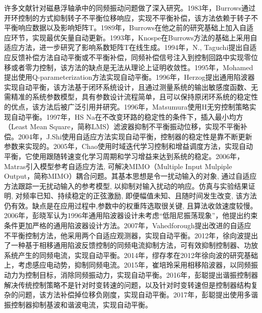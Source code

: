 \documentclass[
  lang=cn,
  degree=master,
  openany,oneside
]{nuaathesis}
\begin{document}
许多文献针对磁悬浮轴承中的同频振动问题做了深入研究。1983年，Burrows通过开环控制的方式抑制转子不平衡位移响应，实现不平衡补偿，该方法依赖于转子不平衡响应数据以及影响矩阵T\cite{burrows1983vibration}。1989年，Burrows在他之前的研究基础上加入自适应环节，实现最优矢量自动更新\cite{burrows1989active}。1993年，Knospe在Burrows方法的基础上采用自适应方法，进一步研究了影响系数矩阵T在线生成\cite{knospe1993adaptive}。1994年，N., Taguchi提出自适应反馈补偿方法自动平衡或不平衡补偿，同频补偿信号注入到控制回路中实现零位移或者零力控制，该方法的缺点是无法从理论上证明收敛性\cite{taguchi1994unbalance}。1995年，Mohamed提出使用Q-parameterization方法实现自动平衡\cite{mohamed1995imbalance}。1996年，Herzog提出通用陷波器实现自动平衡，该方法基于闭环系统设计，且通过测量系统的输出敏感度函数、无需精准的系统参数模型，具有参数设计流程简单，且可以保持原闭环系统的稳定性的优点，该方法后被广泛引用并研究\cite{herzog1996unbalance}。1996年，Matsumura使用H无穷控制策略实现自动平衡\cite{matsumura1996application}。1997年，HS Na在不改变环路的稳定性的条件下，插入最小均方（Least Mean Square，简称LMS）滤波器抑制不平衡振动位移，实现不平衡补偿\cite{na1997adaptive}。2004年，J.Shi使用自适应方法实现自动平衡，控制器的稳定性是靠不断更新参数来实现的\cite{shi2004synchronous}。2005年，Chao使用时域迭代学习控制和增益调度方法，实现自动平衡，它使用跟随转速变化学习周期和学习增益来达到系统的稳定\cite{bi2005automatic}。2006年，Matras引入模型参考自适应方法, 可解决MIMO（Multiple Input Mulpiple Output，简称MIMO）耦合问题。其基本思想是令一扰动输入的对象, 通过自适应方法跟踪一无扰动输入的参考模型, 以抑制对输入扰动的响应。仿真与实验结果证明, 对频率已知、持续稳定的正弦激励, 即便幅值未知、且随时间发生改变, 该方法仍有效。缺点是在应用过程中,参数中的权重阵选取很关键, 且算法收敛速度较慢\cite{matras2006suppression}。2006年，彭晓军认为1996年通用陷波器设计未考虑“低阻尼振荡现象”，他提出约束条件更加严格的通用陷波器设计方法\cite{彭晓军2006磁电轴承中抑制不平衡振动的陷波滤波器设计方法}。2007年，Vahedforough提出改进的自适应不平衡控制方法，他采用两个自适应观测器，实现自动平衡\cite{vahedforough2007estimation}。2012年，徐向波提出了一种基于相移通用陷波反馈控制的同频电流抑制方法，可有效抑制控制器、功放系统产生的同频电流，实现自动平衡\cite{xu2012stability}。2014年，缪存孝在2012年徐向波的研究基础上，考虑感应电动势，抑制同频电流\cite{缪存孝2014含转子不平衡的磁轴承建模与同频电流抑制}。2015年，崔培玲采用相移陷波器，以同频振动力为控制目标，消除同频振动力，实现自动平衡\cite{崔培玲2015基于相移陷波器的磁轴承不平衡振动全频自适应控制}。2016年，彭聪提出谐振控制器解决传统控制策略不是针对时变转速的问题，以及针对时变转速但是控制器结构复杂的问题，该方法补偿掉位移负刚度，实现自动平衡\cite{peng2016synchronous}。2017年，彭聪提出使用多谐振控制器抑制基波和谐波电流，实现自动平衡\cite{peng2016frequency}。
\end{document}
